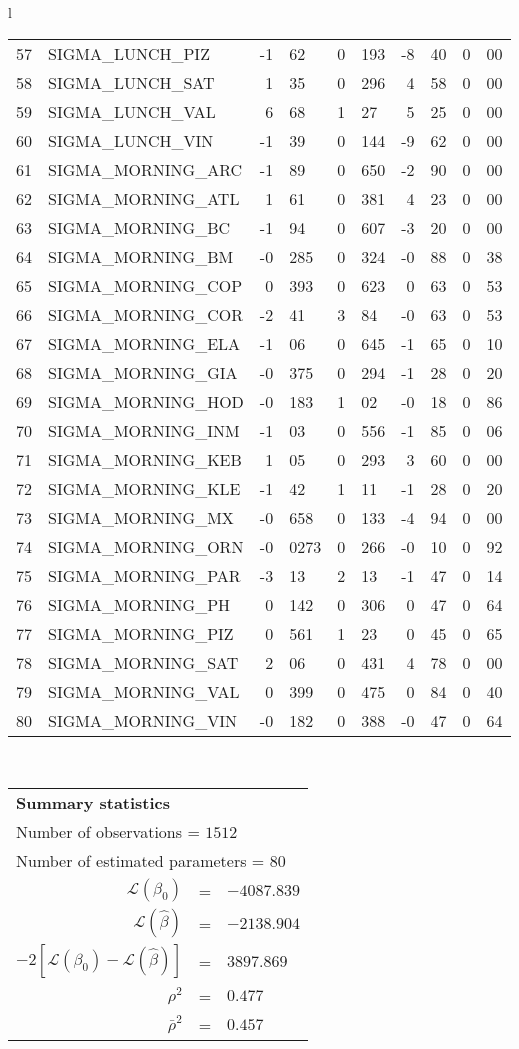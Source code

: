 \begin{tabular}{l}
\begin{tabular}{rlr@{.}lr@{.}lr@{.}lr@{.}l}
57 & SIGMA_LUNCH_PIZ  & -1&62 & 0&193 & -8&40 & 0&00\\
58 & SIGMA_LUNCH_SAT  & 1&35 & 0&296 & 4&58 & 0&00\\
59 & SIGMA_LUNCH_VAL  & 6&68 & 1&27 & 5&25 & 0&00\\
60 & SIGMA_LUNCH_VIN & -1&39 & 0&144 & -9&62 & 0&00\\
61 & SIGMA_MORNING_ARC & -1&89 & 0&650 & -2&90 & 0&00\\
62 & SIGMA_MORNING_ATL  & 1&61 & 0&381 & 4&23 & 0&00\\
63 & SIGMA_MORNING_BC & -1&94 & 0&607 & -3&20 & 0&00\\
64 & SIGMA_MORNING_BM & -0&285 & 0&324 & -0&88 & 0&38\\
65 & SIGMA_MORNING_COP & 0&393 & 0&623 & 0&63 & 0&53\\
66 & SIGMA_MORNING_COR  & -2&41 & 3&84 & -0&63 & 0&53\\
67 & SIGMA_MORNING_ELA & -1&06 & 0&645 & -1&65 & 0&10\\
68 & SIGMA_MORNING_GIA  & -0&375 & 0&294 & -1&28 & 0&20\\
69 & SIGMA_MORNING_HOD  & -0&183 & 1&02 & -0&18 & 0&86\\
70 & SIGMA_MORNING_INM  & -1&03 & 0&556 & -1&85 & 0&06\\
71 & SIGMA_MORNING_KEB  & 1&05 & 0&293 & 3&60 & 0&00\\
72 & SIGMA_MORNING_KLE & -1&42 & 1&11 & -1&28 & 0&20\\
73 & SIGMA_MORNING_MX  & -0&658 & 0&133 & -4&94 & 0&00\\
74 & SIGMA_MORNING_ORN  & -0&0273 & 0&266 & -0&10 & 0&92\\
75 & SIGMA_MORNING_PAR  & -3&13 & 2&13 & -1&47 & 0&14\\
76 & SIGMA_MORNING_PH  & 0&142 & 0&306 & 0&47 & 0&64\\
77 & SIGMA_MORNING_PIZ  & 0&561 & 1&23 & 0&45 & 0&65\\
78 & SIGMA_MORNING_SAT  & 2&06 & 0&431 & 4&78 & 0&00\\
79 & SIGMA_MORNING_VAL  & 0&399 & 0&475 & 0&84 & 0&40\\
80 & SIGMA_MORNING_VIN & -0&182 & 0&388 & -0&47 & 0&64\\
\hline
\end{tabular}
\\
\begin{tabular}{rcl}
\multicolumn{3}{l}{\bf Summary statistics}\\
\multicolumn{3}{l}{ Number of observations = $1512$} \\
\multicolumn{3}{l}{ Number of estimated  parameters = $80$} \\
 $\mathcal{L}(\beta_0)$ &=&  $-4087.839$ \\
 $\mathcal{L}(\hat{\beta})$ &=& $-2138.904 $  \\
 $-2[\mathcal{L}(\beta_0) -\mathcal{L}(\hat{\beta})]$ &=& $3897.869$ \\
    $\rho^2$ &=&   $0.477$ \\
    $\bar{\rho}^2$ &=&    $0.457$ \\
\end{tabular}
  \end{tabular}
